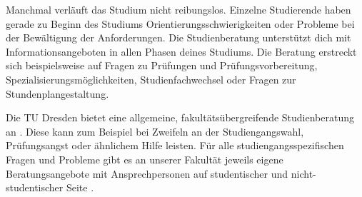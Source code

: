 \newpage
\mbox{}
\thispagestyle{empty}

\newpage

Manchmal verläuft das Studium nicht reibungslos.
Einzelne Studierende haben gerade zu Beginn des Studiums Orientierungsschwierigkeiten oder Probleme bei der Bewältigung der Anforderungen.
Die Studienberatung unterstützt dich mit Informationsangeboten in allen Phasen deines Studiums.
Die Beratung erstreckt sich beispielsweise auf Fragen zu Prüfungen und Prüfungsvorbereitung, Spezialisierungsmöglichkeiten, Studienfachwechsel oder Fragen zur Stundenplangestaltung.

Die TU Dresden bietet eine allgemeine, fakultätsübergreifende Studienberatung an . Diese kann zum Beispiel bei Zweifeln an der Studiengangswahl, Prüfungsangst oder ähnlichem Hilfe leisten. Für alle studiengangsspezifischen Fragen und Probleme gibt es an unserer Fakultät jeweils eigene Beratungsangebote mit Ansprechpersonen auf studentischer und nicht-studentischer Seite .

